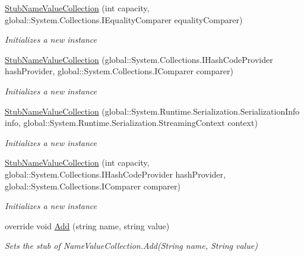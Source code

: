 \begin{DoxyCompactItemize}
\hyperlink{class_system_1_1_collections_1_1_specialized_1_1_fakes_1_1_stub_name_value_collection_aa2e607f289dbfe5073862e7efa1edaa1}{Stub\-Name\-Value\-Collection} (int capacity, global\-::\-System.\-Collections.\-I\-Equality\-Comparer equality\-Comparer)
\begin{DoxyCompactList}\small\item\em Initializes a new instance\end{DoxyCompactList}\item 
\hyperlink{class_system_1_1_collections_1_1_specialized_1_1_fakes_1_1_stub_name_value_collection_a768b9e3acd01f5473820efd532323c48}{Stub\-Name\-Value\-Collection} (global\-::\-System.\-Collections.\-I\-Hash\-Code\-Provider hash\-Provider, global\-::\-System.\-Collections.\-I\-Comparer comparer)
\begin{DoxyCompactList}\small\item\em Initializes a new instance\end{DoxyCompactList}\item 
\hyperlink{class_system_1_1_collections_1_1_specialized_1_1_fakes_1_1_stub_name_value_collection_ab795e08ccce9876168d961509ea2f6e7}{Stub\-Name\-Value\-Collection} (global\-::\-System.\-Runtime.\-Serialization.\-Serialization\-Info info, global\-::\-System.\-Runtime.\-Serialization.\-Streaming\-Context context)
\begin{DoxyCompactList}\small\item\em Initializes a new instance\end{DoxyCompactList}\item 
\hyperlink{class_system_1_1_collections_1_1_specialized_1_1_fakes_1_1_stub_name_value_collection_a37d29d4b8c39950fac455f823ca5abdf}{Stub\-Name\-Value\-Collection} (int capacity, global\-::\-System.\-Collections.\-I\-Hash\-Code\-Provider hash\-Provider, global\-::\-System.\-Collections.\-I\-Comparer comparer)
\begin{DoxyCompactList}\small\item\em Initializes a new instance\end{DoxyCompactList}\item 
override void \hyperlink{class_system_1_1_collections_1_1_specialized_1_1_fakes_1_1_stub_name_value_collection_a6a757d55a48cf4b95d39d708f2e374bf}{Add} (string name, string value)
\begin{DoxyCompactList}\small\item\em Sets the stub of Name\-Value\-Collection.\-Add(\-String name, String value)\end{DoxyCompactList}\item 

\end{DoxyCompactItemize}
